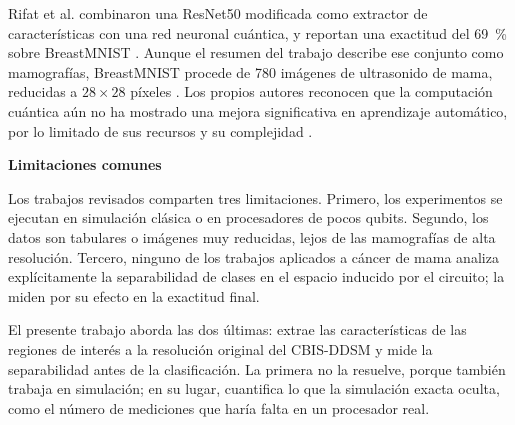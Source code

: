 Rifat et al. combinaron una ResNet50 modificada como extractor de características con una red neuronal cuántica, y reportan una exactitud del 69~\% sobre BreastMNIST \cite{Rifat2024}.
Aunque el resumen del trabajo describe ese conjunto como mamografías, BreastMNIST procede de 780 imágenes de ultrasonido de mama, reducidas a $28 \times 28$ píxeles \cite{Rifat2024, Yang2023MedMNIST}.
Los propios autores reconocen que la computación cuántica aún no ha mostrado una mejora significativa en aprendizaje automático, por lo limitado de sus recursos y su complejidad \cite{Rifat2024}.

\textbf{Limitaciones comunes}

Los trabajos revisados comparten tres limitaciones. Primero, los experimentos se ejecutan en simulación clásica o en procesadores de pocos qubits. Segundo, los datos son tabulares o imágenes muy reducidas, lejos de las mamografías de alta resolución. Tercero, ninguno de los trabajos aplicados a cáncer de mama analiza explícitamente la separabilidad de clases en el espacio inducido por el circuito; la miden por su efecto en la exactitud final.

El presente trabajo aborda las dos últimas: extrae las características de las regiones de interés a la resolución original del CBIS-DDSM y mide la separabilidad antes de la clasificación. La primera no la resuelve, porque también trabaja en simulación; en su lugar, cuantifica lo que la simulación exacta oculta, como el número de mediciones que haría falta en un procesador real.
